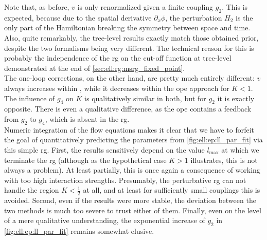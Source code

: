 Note that, as before, $v$ is only renormalized given a finite coupling $g_2$.
This is expected, because due to the spatial derivative $\partial_x\phi$, the perturbation $H_2$ is the only part of the Hamiltonian breaking the symmetry between space and time.
Also, quite remarkably, the tree-level results exactly match those obtained prior, despite the two formalisms being very different.
The technical reason for this is probably the independence of the \tms{} \gls{rg} on the cut-off function at tree-level demonstrated at the end of \autoref{sec:ell:rg:msrg_fixed_point}.\\
The one-loop corrections, on the other hand, are pretty much entirely different: $v$ always increases within \tms{}, while it decreases within the \gls{ope} approach for $K<1$.
The influence of $g_4$ on $K$ is qualitatively similar in both, but for $g_2$ it is exactly opposite.
There is even a qualitative difference, as the \gls{ope} contains a feedback from $g_2$ to $g_4$, which is absent in the \tms{} \gls{rg}.\\
Numeric integration of the flow equations makes it clear that we have to forfeit the goal of quantitatively predicting the parameters from \autoref{fig:ell:ep:ll_par_fit} via this simple \gls{rg}.
First, the results sensitively depend on the value $l_\text{max}$ at which we terminate the \gls{rg} (although as the hypothetical case $K>1$ illustrates, this is not always a problem).
At least partially, this is once again a consequence of working with too high interaction strengths.
Presumably, the perturbative \gls{rg} can not handle the region $K< \frac{1}{2}$ at all, and at least for sufficiently small couplings this is avoided.
Second, even if the results were more stable, the deviation between the two methods is much too severe to trust either of them.
Finally, even on the level of a mere qualitative understanding, the exponential increase of $g_2$ in \autoref{fig:ell:ep:ll_par_fit} remains somewhat elusive.%
